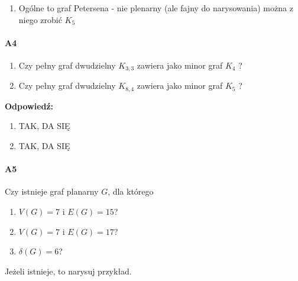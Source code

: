 \begin{enumerate}[label=\alph*)]
\item Ogólne to graf Petersena - nie plenarny (ale fajny do narysowania) można z niego zrobić $K_5$
\begin{figure}[H]
\centering
{}
\end{figure}


\end{enumerate}

\paragraph{A4}
\begin{enumerate}[label=\alph*)]
\item Czy pełny graf dwudzielny $K_{3,3}$ zawiera jako minor graf $K_4$ ?
\item Czy pełny graf dwudzielny $K_{8,4}$ zawiera jako minor graf $K_5$ ?
\end{enumerate}
\textbf{Odpowiedź:} 
\begin{enumerate}[label=\alph*)]
\item TAK, DA SIĘ
\item TAK, DA SIĘ
\end{enumerate}

\paragraph{A5} Czy istnieje graf planarny $G$, dla którego
\begin{enumerate}[label=\alph*)]
\item  $V(G) = 7$ i $E(G) = 15$?
\item  $V(G) = 7$ i $E(G) = 17$?
  \item  $\delta (G) = 6$?
\end{enumerate}
Jeżeli istnieje, to narysuj przykład.

